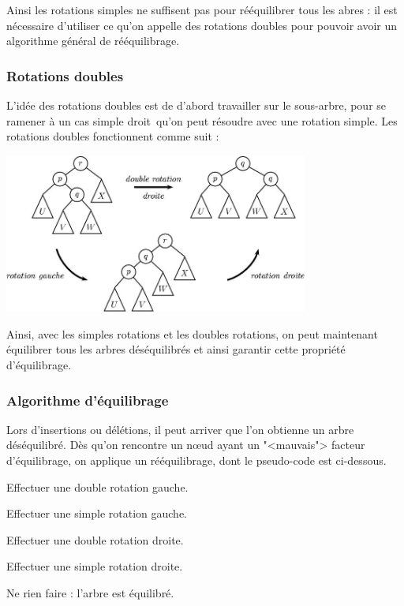 \documentclass{article}
\begin{document}
Ainsi les rotations simples ne suffisent pas pour rééquilibrer tous les abres : il est nécessaire d'utiliser ce qu'on appelle des rotations doubles pour pouvoir avoir un algorithme général de rééquilibrage.

\subsubsection{Rotations doubles}
L'idée des rotations doubles est de d'abord travailler sur le sous-arbre, pour se ramener à un cas simple \guillemotleft droit\guillemotright\ qu'on peut résoudre avec une rotation simple. Les rotations doubles fonctionnent comme suit :

\includegraphics[width = 10cm]{poly095.jpg}

Ainsi, avec les simples rotations et les doubles rotations, on peut maintenant équilibrer tous les arbres déséquilibrés et ainsi garantir cette propriété d'équilibrage.

\subsubsection{Algorithme d'équilibrage}
Lors d'insertions ou délétions, il peut arriver que l'on obtienne un arbre déséquilibré. Dès qu'on rencontre un n\oe ud ayant un "<mauvais"> facteur d'équilibrage,
on applique un rééquilibrage, dont le pseudo-code est ci-dessous.

\begin{algorithmic}


Effectuer une double rotation gauche.
\Else

Effectuer une simple rotation gauche.

\EndIf
{}


Effectuer une double rotation droite.
\Else

Effectuer une simple rotation droite.
\EndIf
\Else

Ne rien faire : l'arbre est équilibré.
\EndIf
\end{algorithmic}
\end{document}
